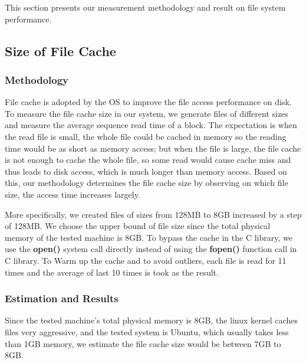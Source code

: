 This section presents our measurement methodology and result on file system performance.

\subsection{Size of File Cache}

\subsubsection{Methodology}
File cache is adopted by the OS to improve the file access performance on disk. To measure the file cache size in our system, we generate files of different sizes and measure the average sequence read time of a block. The expectation is when the read file is small, the whole file could be cached in memory so the reading time would be as short as memory access; but when the file is large, the file cache is not enough to cache the whole file, so some read would cause cache miss and thus
leads to disk access, which is much longer than memory access. Based on this, our methodology determines the file cache size by observing on which file size, the access time increases largely.

More specifically, we created files of sizes from 128MB to 8GB increased by a step of 128MB. We choose the upper bound of file size since the total physical memory of the tested machine is 8GB. To bypass the cache in the C library, we use the \textbf{open()} system call directly instead of using the \textbf{fopen()} function call in C library. To Warm up the cache and to avoid outliers, each file is read for 11 times and the average of last 10 times is took as the result.

\subsubsection{Estimation and Results}
\label {File_cache_size_section}
Since the tested machine's total physical memory is 8GB, the linux kernel caches files very aggressive, and the tested system is Ubuntu, which usually takes less than 1GB memory, we estimate the file cache size would be between 7GB to 8GB.


